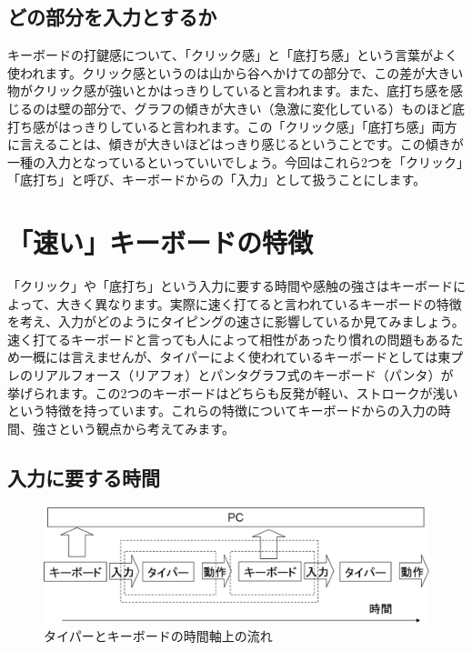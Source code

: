 \subsection{どの部分を入力とするか}
キーボードの打鍵感について、「クリック感」と「底打ち感」という言葉がよく使われます。クリック感というのは山から谷へかけての部分で、この差が大きい物がクリック感が強いとかはっきりしていると言われます。また、底打ち感を感じるのは壁の部分で、グラフの傾きが大きい（急激に変化している）ものほど底打ち感がはっきりしていると言われます。この「クリック感」「底打ち感」両方に言えることは、傾きが大きいほどはっきり感じるということです。この傾きが一種の入力となっているといっていいでしょう。今回はこれら2つを「クリック」「底打ち」と呼び、キーボードからの「入力」として扱うことにします。

\section{「速い」キーボードの特徴}
「クリック」や「底打ち」という入力に要する時間や感触の強さはキーボードによって、大きく異なります。実際に速く打てると言われているキーボードの特徴を考え、入力がどのようにタイピングの速さに影響しているか見てみましょう。　
速く打てるキーボードと言っても人によって相性があったり慣れの問題もあるため一概には言えませんが、タイパーによく使われているキーボードとしては東プレのリアルフォース（リアフォ）とパンタグラフ式のキーボード（パンタ）が挙げられます。この2つのキーボードはどちらも反発が軽い、ストロークが浅いという特徴を持っています。これらの特徴についてキーボードからの入力の時間、強さという観点から考えてみます。

\subsection{入力に要する時間}

\begin{figure}
 \begin{center}
   \includegraphics[width=14cm,clip]{res_eigh/img3.eps}
 \end{center}
 \caption{タイパーとキーボードの時間軸上の流れ}
 \label{eigh:img3}
\end{figure}

